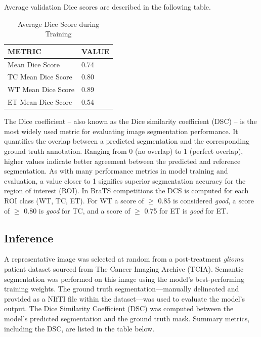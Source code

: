 \documentclass[12pt, onecolumn]{IEEEtran}
\begin{document}
Average validation Dice scores are described in the following table.
\begin{table}[H]
	\centering
	\caption{Average Dice Score during Training}
	\begin{tabular}{|l|l|}
		\hline
		\textbf{METRIC}    & \textbf{VALUE} \\ \hline
		Mean Dice Score    & 0.74           \\ \hline
		TC Mean Dice Score & 0.80           \\ \hline
		WT Mean Dice Score & 0.89           \\ \hline
		ET Mean Dice Score & 0.54           \\ \hline
	\end{tabular}
\end{table}

The Dice coefficient -- also known as the Dice similarity coefficient (DSC) -- is the most widely used metric for evaluating image segmentation performance. It quantifies the overlap between a predicted segmentation and the corresponding ground truth annotation. Ranging from 0 (no overlap) to 1 (perfect overlap), higher values indicate better agreement between the predicted and reference segmentation. As with many performance metrics in model training and evaluation, a value closer to 1 signifies superior segmentation accuracy for the region of interest (ROI)\cite{rainio2026}.  In BraTS competitions the DCS is computed for each ROI class (WT, TC, ET).  For WT a score of $\geq$ 0.85 is considered \textit{good}, a score of $\geq$ 0.80 is \textit{good} for TC, and a score of $\geq$ 0.75 for ET is \textit{good} for ET\cite{rainio2026}.
 
\subsection{Inference}
A representative image was selected at random from a post-treatment \textit{glioma} patient dataset sourced from The Cancer Imaging Archive (TCIA). Semantic segmentation was performed on this image using the model’s best-performing training weights. The ground truth segmentation—manually delineated and provided as a NIfTI file within the dataset—was used to evaluate the model’s output. The Dice Similarity Coefficient (DSC) was computed between the model’s predicted segmentation and the ground truth mask. Summary metrics, including the DSC, are listed in the table below.
\end{document}
